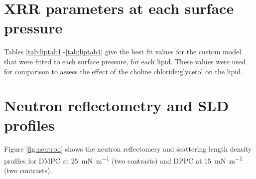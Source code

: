 \documentclass[amsmath,amssymb,superscriptaddress]{revtex4-1}
\begin{document}
\section{XRR parameters at each surface pressure}
Tables \ref{tab:liptab1}-\ref{tab:liptab4} give the best fit values for the custom model that were fitted to each surface pressure, for each lipid. These values were used for comparison to assess the effect of the choline chloride:glycerol on the lipid.

\section{Neutron reflectometry and SLD profiles}
Figure \ref{fig:neutron} shows the neutron reflectomery and scattering length density profiles for DMPC at \SI{25}{\milli\newton\per\meter} (two contrasts) and DPPC at \SI{15}{\milli\newton\per\meter} (two contrasts).
\end{document}
